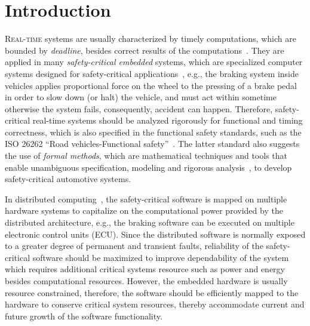 \chapter{Introduction}\label{chapter_introduction}
\lettrine{R}{eal-time} systems are usually characterized by timely computations, which are bounded by \textit{deadline}, besides correct results of the computations~\cite{Buttazzo2003}. They are applied in many \textit{safety-critical embedded} systems, which are specialized computer systems designed for safety-critical applications~\cite{WangJiacun2017RES}, e.g., the braking system inside vehicles applies proportional force on the wheel to the pressing of a brake pedal in order to slow down (or halt) the vehicle, and must act within sometime otherwise the system fails, consequently, accident can happen. Therefore, safety-critical real-time systems should be analyzed rigorously for functional and timing correctness, which is also specified in the functional safety standards, such as the ISO 26262 ``Road vehicles-Functional safety''~\cite{iso201126262}. The latter standard also suggests the use of \textit{formal methods}, which are mathematical techniques and tools that enable unambiguous specification, modeling and rigorous analysis~\cite{o2017concise}, to develop safety-critical automotive systems.

In distributed computing~\cite{Kopetz2003Real-timeApplications}, the safety-critical software is mapped on multiple hardware systems to capitalize on the computational power provided by the distributed architecture, e.g., the braking software can be executed on multiple electronic control units (ECU). Since the distributed software is  normally exposed to a greater degree of permanent and transient faults, reliability of the safety-critical software should be maximized to improve dependability of the  system which requires additional critical systems resource such as power and energy besides computational resources. However, the embedded hardware is usually resource constrained, therefore, the software should be efficiently mapped to the hardware to conserve critical system resources, thereby accommodate current and future growth of the software functionality.

